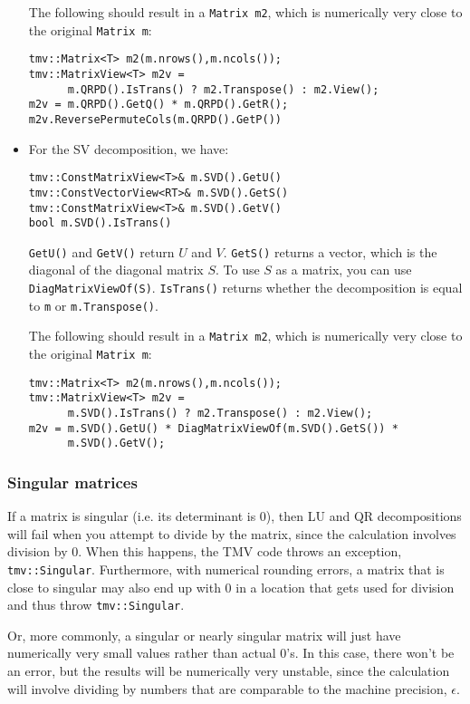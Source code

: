 \documentclass[twoside,letterpaper,11pt]{article}
\renewcommand{\tt}[1]{{\texttt {#1}}}
\begin{document}
\begin{itemize}
The following should result in a \tt{Matrix m2}, which is numerically very close to
the original \tt{Matrix m}:
\begin{verbatim}
tmv::Matrix<T> m2(m.nrows(),m.ncols());
tmv::MatrixView<T> m2v = 
      m.QRPD().IsTrans() ? m2.Transpose() : m2.View();
m2v = m.QRPD().GetQ() * m.QRPD().GetR();
m2v.ReversePermuteCols(m.QRPD().GetP())
\end{verbatim}

\item
For the SV decomposition, we have:
\begin{verbatim}
tmv::ConstMatrixView<T>& m.SVD().GetU()
tmv::ConstVectorView<RT>& m.SVD().GetS()
tmv::ConstMatrixView<T>& m.SVD().GetV()
bool m.SVD().IsTrans()
\end{verbatim}
\tt{GetU()} and \tt{GetV()} return $U$ and $V$.
\tt{GetS()} returns a vector, which is the diagonal
of the diagonal matrix $S$.  To use $S$ as a matrix, you can use
\tt{DiagMatrixViewOf(S)}.
\tt{IsTrans()} returns whether
the decomposition is equal to \tt{m} or \tt{m.Transpose()}.  

The following should result in a \tt{Matrix m2}, which is numerically very close to
the original \tt{Matrix m}:
\begin{verbatim}
tmv::Matrix<T> m2(m.nrows(),m.ncols());
tmv::MatrixView<T> m2v = 
      m.SVD().IsTrans() ? m2.Transpose() : m2.View();
m2v = m.SVD().GetU() * DiagMatrixViewOf(m.SVD().GetS()) * 
      m.SVD().GetV();
\end{verbatim}
\end{itemize}

\subsubsection{Singular matrices}
\label{singular}

If a matrix is singular (i.e. its determinant is 0), 
then LU and QR decompositions
will fail when you attempt to divide by the matrix, since the 
calculation involves division by 0.  When this happens, the TMV code
throws an exception,
\tt{tmv::Singular}.  Furthermore, with numerical rounding errors, 
a matrix
that is close to singular may also end up with 0 in a location that gets
used for division and thus throw \tt{tmv::Singular}.

Or, more commonly, a singular or nearly singular matrix
will just have numerically very small values rather than actual 0's.  In this 
case, there won't be an error, but the results will be numerically
very unstable, since the calculation will involve dividing by numbers
that are comparable to the machine precision, $\epsilon$.
\end{document}
